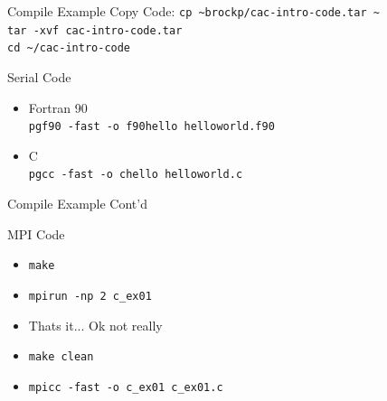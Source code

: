 \documentclass[handout]{beamer}
\begin{document}
\begin{frame}{Compile Example}
 Copy Code: \texttt{cp \~{}brockp/cac-intro-code.tar \~{}} 
 \\ \texttt{tar -xvf cac-intro-code.tar}  \\ \texttt{cd \~{}/cac-intro-code}
 \begin{block}{Serial Code}
  \begin{itemize}
   \item Fortran 90
         \\ \texttt{pgf90 -fast -o f90hello helloworld.f90}
   \item C
         \\ \texttt{pgcc -fast -o chello helloworld.c}
  \end{itemize}
 \end{block}
\end{frame}
\begin{frame}{Compile Example Cont'd}
 \begin{block}{MPI Code}
  \begin{itemize}
   \item \texttt{make}
   \item \texttt{mpirun -np 2 c\_ex01}
   \item <2-> Thats it...  Ok not really
   \item <3-> \texttt{make clean}
   \item <3-> \texttt{mpicc -fast -o c\_ex01 c\_ex01.c}
  \end{itemize}
 \end{block}
\end{frame}
\end{document}
